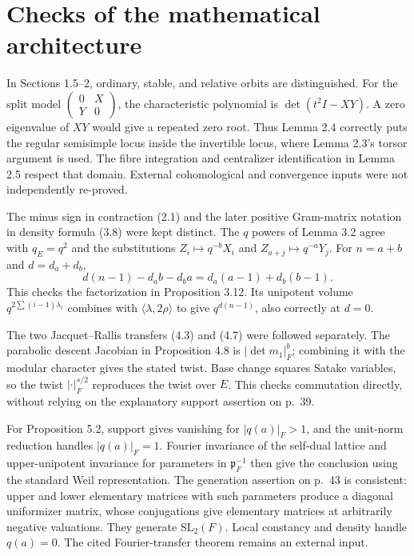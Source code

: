 \documentclass[10pt]{article}
\begin{document}
\section*{Checks of the mathematical architecture}
In Sections 1.5–2, ordinary, stable, and relative orbits are distinguished. For the split model \(\left(\begin{smallmatrix}0&X\\Y&0\end{smallmatrix}\right)\), the characteristic polynomial is \(\det(t^2I-XY)\). A zero eigenvalue of \(XY\) would give a repeated zero root. Thus Lemma 2.4 correctly puts the regular semisimple locus inside the invertible locus, where Lemma 2.3’s torsor argument is used. The fibre integration and centralizer identification in Lemma 2.5 respect that domain. External cohomological and convergence inputs were not independently re-proved.\par
The minus sign in contraction (2.1) and the later positive Gram-matrix notation in density formula (3.8) were kept distinct. The \(q\) powers of Lemma 3.2 agree with \(q_E=q^2\) and the substitutions \(Z_i\mapsto q^{-b}X_i\) and \(Z_{a+j}\mapsto q^{-a}Y_j\). For \(n=a+b\) and \(d=d_a+d_b\), \[d(n-1)-d_ab-d_ba=d_a(a-1)+d_b(b-1).\] This checks the factorization in Proposition 3.12. Its unipotent volume \(q^{2\sum(i-1)\lambda_i}\) combines with \(\langle\lambda,2\rho\rangle\) to give \(q^{d(n-1)}\), also correctly at \(d=0\).\par
The two Jacquet–Rallis transfers (4.3) and (4.7) were followed separately. The parabolic descent Jacobian in Proposition 4.8 is \(|\det m_1|_F^b\); combining it with the modular character gives the stated twist. Base change squares Satake variables, so the twist \(|\cdot|_F^{s/2}\) reproduces the twist over \(E\). This checks commutation directly, without relying on the explanatory support assertion on p. 39.\par
For Proposition 5.2, support gives vanishing for \(|q(a)|_F>1\), and the unit-norm reduction handles \(|q(a)|_F=1\). Fourier invariance of the self-dual lattice and upper-unipotent invariance for parameters in \(\mathfrak p_F^{-1}\) then give the conclusion using the standard Weil representation. The generation assertion on p. 43 is consistent: upper and lower elementary matrices with such parameters produce a diagonal uniformizer matrix, whose conjugations give elementary matrices at arbitrarily negative valuations. They generate \(\mathrm{SL}_2(F)\). Local constancy and density handle \(q(a)=0\). The cited Fourier-transfer theorem remains an external input.\par
\end{document}
